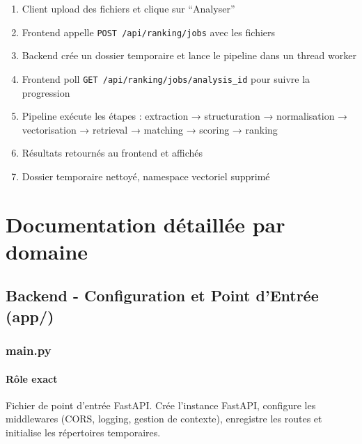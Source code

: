 \documentclass[12pt,a4paper,oneside]{book}
\begin{document}
\begin{enumerate}
    \item Client upload des fichiers et clique sur ``Analyser''
    \item Frontend appelle \texttt{POST /api/ranking/jobs} avec les fichiers
    \item Backend crée un dossier temporaire et lance le pipeline dans un thread worker
    \item Frontend poll \texttt{GET /api/ranking/jobs/{analysis\_id}} pour suivre la progression
    \item Pipeline exécute les étapes : extraction → structuration → normalisation → vectorisation → retrieval → matching → scoring → ranking
    \item Résultats retournés au frontend et affichés
    \item Dossier temporaire nettoyé, namespace vectoriel supprimé
\end{enumerate}

\newpage


\chapter{Documentation détaillée par domaine}


\section{Backend - Configuration et Point d'Entrée (app/)}

\subsection{main.py}

\subsubsection{Rôle exact}

Fichier de point d'entrée FastAPI. Crée l'instance FastAPI, configure les middlewares (CORS, logging, gestion de contexte), enregistre les routes et initialise les répertoires temporaires.
\end{document}
